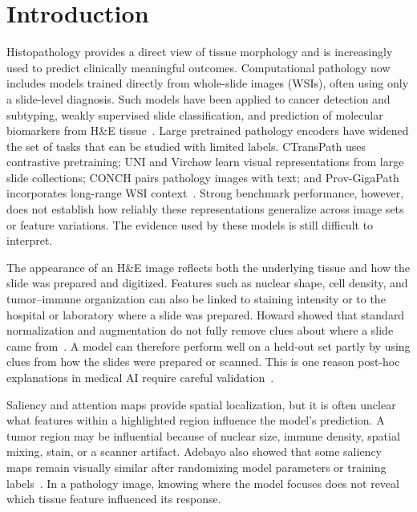\section{Introduction}
\label{sec:intro}

Histopathology provides a direct view of tissue morphology and is increasingly used to predict clinically meaningful outcomes. Computational pathology now includes models trained directly from whole-slide images (WSIs), often using only a slide-level diagnosis. Such models have been applied to cancer detection and subtyping, weakly supervised slide classification, and prediction of molecular biomarkers from H\&E tissue~\cite{campanella2019clinical,lu2021clam,kather2019msi,shmatko2022ai}. Large pretrained pathology encoders have widened the set of tasks that can be studied with limited labels. CTransPath uses contrastive pretraining; UNI and Virchow learn visual representations from large slide collections; CONCH pairs pathology images with text; and Prov-GigaPath incorporates long-range WSI context~\cite{wang2022ctranspath,chen2024uni,lu2024conch,vorontsov2024virchow,xu2024gigapath}. Strong benchmark performance, however, does not establish how reliably these representations generalize across image sets or feature variations. The evidence used by these models is still difficult to interpret.

The appearance of an H\&E image reflects both the underlying tissue and how the slide was prepared and digitized. Features such as nuclear shape, cell density, and tumor--immune organization can also be linked to staining intensity or to the hospital or laboratory where a slide was prepared. Howard \etal{} showed that standard normalization and augmentation do not fully remove clues about where a slide came from~\cite{howard2021sitespecific}. A model can therefore perform well on a held-out set partly by using clues from how the slides were prepared or scanned. This is one reason post-hoc explanations in medical AI require careful validation~\cite{ghassemi2021falsehope,klauschen2024xai}.

Saliency and attention maps provide spatial localization, but it is often unclear what features within a highlighted region influence the model's prediction. A tumor region may be influential because of nuclear size, immune density, spatial mixing, stain, or a scanner artifact. Adebayo \etal{} also showed that some saliency maps remain visually similar after randomizing model parameters or training labels~\cite{adebayo2018sanity}. In a pathology image, knowing where the model focuses does not reveal which tissue feature influenced its response.

